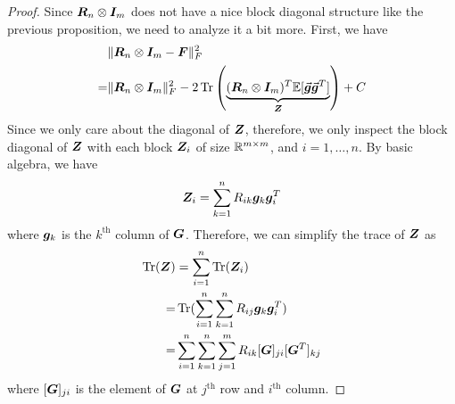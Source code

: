 \begin{proof}
    Since ${\bm{R}}_n\otimes {\bm{I}}_m$ does not have a nice block diagonal structure like the previous proposition, we need to analyze it a bit more. First, we have
    \begin{align*}
        &\Vert{\bm{R}}_n \otimes {\bm{I}}_m - {\bm{F}}\Vert_F^2\\
        =& \Vert{\bm{R}}_n\otimes {\bm{I}}_m\Vert_F^2 - 2\operatorname{Tr}\left(\underbrace{({\bm{R}}_n\otimes {\bm{I}}_m)^T\mathbb{E}[\vec{\bm{g}}\vec{\bm{g}}^T]}_{{\bm{Z}}}\right) + C\\
    \end{align*}
Since we only care about the diagonal of ${\bm{Z}}$, therefore, we only inspect the block diagonal of ${\bm{Z}}$ with each block ${\bm{Z}}_i$ of size $\mathbb{R}^{m\times m}$, and $i=1,\ldots, n$. By basic algebra, we have
\begin{align*}
    {\bm{Z}}_i = \sum_{k=1}^n R_{ik} {\bm{g}}_k{\bm{g}}_i^T
\end{align*}
where ${\bm{g}}_k$ is the $k^{\text{th}}$ column of ${\bm{G}}$. Therefore, we can simplify the trace of ${\bm{Z}}$ as 
\begin{align*}
    \operatorname{Tr}({\bm{Z}}) &= \sum_{i=1}^n\operatorname{Tr}({\bm{Z}}_i)\\
    =& \operatorname{Tr}(\sum_{i=1}^n\sum_{k=1}^n R_{ij}{\bm{g}}_k{\bm{g}}_i^T)\\
    =& \sum_{i=1}^n\sum_{k=1}^n\sum_{j=1}^m R_{ik}[{\bm{G}}]_{ji}[{\bm{G}}^T]_{kj}
\end{align*}
where $[{\bm{G}}]_{ji}$ is the element of ${\bm{G}}$ at $j^{\text{th}}$ row and $i^{\text{th}}$ column. 


\end{proof}
